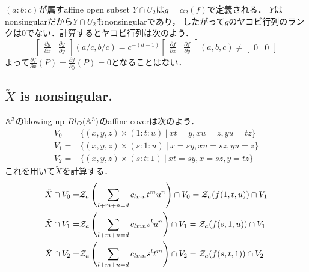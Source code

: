 \documentclass[a4paper]{jsarticle}
\begin{document}
    $(a:b:c)$が属すaffine open subset $Y \cap U_2$は$g=\alpha_2(f)$で定義される．
    $Y$はnonsingularだから$Y \cap U_2$もnonsingularであり，
    したがって$g$のヤコビ行列のランクは0でない．計算するとヤコビ行列は次のよう．
    \[
        \begin{bmatrix}
            \frac{\partial g}{\partial x} & \frac{\partial g}{\partial y}
        \end{bmatrix}
        (a/c,b/c)
        =
        c^{-(d-1)}
        \begin{bmatrix}
            \frac{\partial f}{\partial x} & \frac{\partial f}{\partial y}
        \end{bmatrix}
        (a,b,c)
        \neq 
        \begin{bmatrix}
            0 & 0
        \end{bmatrix}
    \]
    よって$\frac{\partial f}{\partial x}(P)=\frac{\partial f}{\partial y}(P)=0$となることはない．

    \subsection{$\tilde{X}$ is nonsingular.}
    $\mathbb{A}^3$のblowing up $Bl_O(\mathbb{A}^3)$のaffine coverは次のよう．
    \begin{align*}
        V_0=&\{ (x,y,z) \times (1:t:u) ~|~ xt=y, xu=z, yu=tz \} \\
        V_1=&\{ (x,y,z) \times (s:1:u) ~|~ x=sy, xu=sz, yu=z \} \\
        V_2=&\{ (x,y,z) \times (s:t:1) ~|~ xt=sy, x=sz, y=tz \}
    \end{align*}
    これを用いて$\tilde{X}$を計算する．
    \begin{align*}
        \tilde{X} \cap V_0=&\mathcal{Z}_a \left( \sum_{l+m+n=d}{c_{lmn} t^m u^n} \right) \cap V_0 = \mathcal{Z}_a(f(1,t,u)) \cap V_1 \\
        \tilde{X} \cap V_1=&\mathcal{Z}_a \left( \sum_{l+m+n=d}{c_{lmn} s^l u^n} \right) \cap V_1 = \mathcal{Z}_a(f(s,1,u)) \cap V_1 \\
        \tilde{X} \cap V_2=&\mathcal{Z}_a \left( \sum_{l+m+n=d}{c_{lmn} s^l t^m} \right) \cap V_2 = \mathcal{Z}_a(f(s,t,1)) \cap V_2
    \end{align*}
\end{document}
